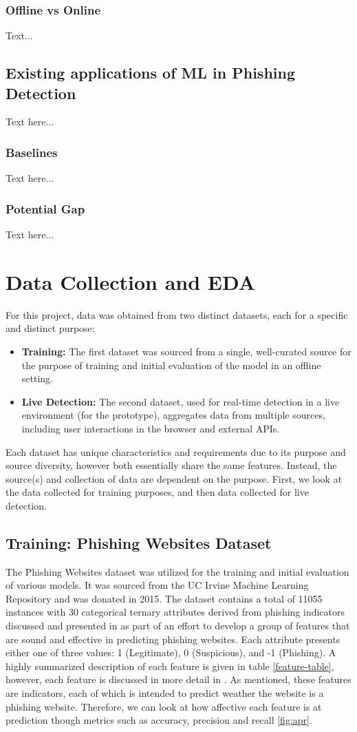 \documentclass{sigkddExp}
\begin{document}
\subsubsection{Offline vs Online}
Text...
\subsection{Existing applications of ML in Phishing Detection}
Text here...
\subsubsection{Baselines}
Text here...
\subsubsection{Potential Gap}
Text here...

\section{Data Collection and EDA}
For this project, data was obtained from two distinct datasets, each for a specific and distinct purpose:
\begin{itemize}
	\item \textbf{Training:} The first dataset was sourced from a single, well-curated source for the purpose of training and initial evaluation of the model in an offline setting.
	\item \textbf{Live Detection:} The second dataset, used for real-time detection in a live environment (for the prototype), aggregates data from multiple sources, including user interactions in the browser and external APIs.
\end{itemize}
Each dataset has unique characteristics and requirements due to its purpose and source diversity, however both essentially share the same features. Instead, the source(s) and collection of data are dependent on the purpose. First, we look at the data collected for training purposes, and then data collected for live detection.
\subsection{Training: Phishing Websites Dataset}
The Phishing Websites dataset was utilized for the training and initial evaluation of various models. It was sourced from the UC Irvine Machine Learning Repository and was donated in 2015. The dataset contains a total of 11055 instances with 30 categorical ternary attributes derived from phishing indicators discussed and presented in \cite{6470857} as part of an effort to develop a group of features that are sound and effective in predicting phishing websites. Each attribute presents either one of three values: 1 (Legitimate), 0 (Suspicious), and -1 (Phishing). A highly summarized description of each feature is given in table \ref{feature-table}, however, each feature is discussed in more detail in \cite{6470857}. As mentioned, these features are indicators, each of which is intended to predict weather the website is a phishing website. Therefore, we can look at how affective each feature is at prediction though metrics such as accuracy, precision and recall \ref{fig:apr}.
\end{document}
